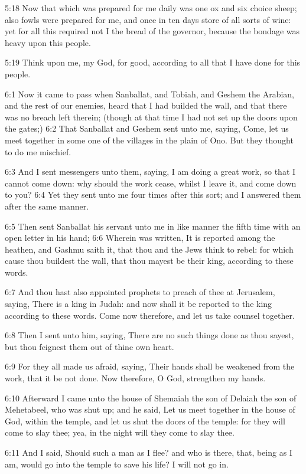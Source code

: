 5:18 Now that which was prepared for me daily was one ox and six choice sheep; also fowls were prepared for me, and once in ten days store of all sorts of wine: yet for all this required not I the bread of the governor, because the bondage was heavy upon this people.

5:19 Think upon me, my God, for good, according to all that I have done for this people.

6:1 Now it came to pass when Sanballat, and Tobiah, and Geshem the Arabian, and the rest of our enemies, heard that I had builded the wall, and that there was no breach left therein; (though at that time I had not set up the doors upon the gates;) 6:2 That Sanballat and Geshem sent unto me, saying, Come, let us meet together in some one of the villages in the plain of Ono. But they thought to do me mischief.

6:3 And I sent messengers unto them, saying, I am doing a great work, so that I cannot come down: why should the work cease, whilst I leave it, and come down to you?  6:4 Yet they sent unto me four times after this sort; and I answered them after the same manner.

6:5 Then sent Sanballat his servant unto me in like manner the fifth time with an open letter in his hand; 6:6 Wherein was written, It is reported among the heathen, and Gashmu saith it, that thou and the Jews think to rebel: for which cause thou buildest the wall, that thou mayest be their king, according to these words.

6:7 And thou hast also appointed prophets to preach of thee at Jerusalem, saying, There is a king in Judah: and now shall it be reported to the king according to these words. Come now therefore, and let us take counsel together.

6:8 Then I sent unto him, saying, There are no such things done as thou sayest, but thou feignest them out of thine own heart.

6:9 For they all made us afraid, saying, Their hands shall be weakened from the work, that it be not done. Now therefore, O God, strengthen my hands.

6:10 Afterward I came unto the house of Shemaiah the son of Delaiah the son of Mehetabeel, who was shut up; and he said, Let us meet together in the house of God, within the temple, and let us shut the doors of the temple: for they will come to slay thee; yea, in the night will they come to slay thee.

6:11 And I said, Should such a man as I flee? and who is there, that, being as I am, would go into the temple to save his life? I will not go in.

